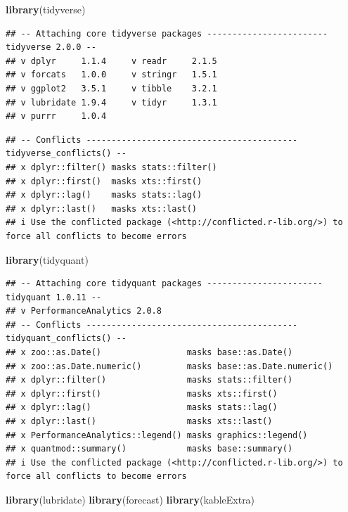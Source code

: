 \documentclass[
]{article}
\newenvironment{Shaded}{\begin{snugshade}}{\end{snugshade}}
\newcommand{\FunctionTok}[1]{\textcolor[rgb]{0.13,0.29,0.53}{\textbf{#1}}}
\newcommand{\NormalTok}[1]{#1}
\begin{document}
\begin{Shaded}
\begin{Highlighting}[]
\FunctionTok{library}\NormalTok{(tidyverse)}
\end{Highlighting}
\end{Shaded}

\begin{verbatim}
## -- Attaching core tidyverse packages ------------------------ tidyverse 2.0.0 --
## v dplyr     1.1.4     v readr     2.1.5
## v forcats   1.0.0     v stringr   1.5.1
## v ggplot2   3.5.1     v tibble    3.2.1
## v lubridate 1.9.4     v tidyr     1.3.1
## v purrr     1.0.4
\end{verbatim}

\begin{verbatim}
## -- Conflicts ------------------------------------------ tidyverse_conflicts() --
## x dplyr::filter() masks stats::filter()
## x dplyr::first()  masks xts::first()
## x dplyr::lag()    masks stats::lag()
## x dplyr::last()   masks xts::last()
## i Use the conflicted package (<http://conflicted.r-lib.org/>) to force all conflicts to become errors
\end{verbatim}

\begin{Shaded}
\begin{Highlighting}[]
\FunctionTok{library}\NormalTok{(tidyquant)}
\end{Highlighting}
\end{Shaded}

\begin{verbatim}
## -- Attaching core tidyquant packages ----------------------- tidyquant 1.0.11 --
## v PerformanceAnalytics 2.0.8     
## -- Conflicts ------------------------------------------ tidyquant_conflicts() --
## x zoo::as.Date()                 masks base::as.Date()
## x zoo::as.Date.numeric()         masks base::as.Date.numeric()
## x dplyr::filter()                masks stats::filter()
## x dplyr::first()                 masks xts::first()
## x dplyr::lag()                   masks stats::lag()
## x dplyr::last()                  masks xts::last()
## x PerformanceAnalytics::legend() masks graphics::legend()
## x quantmod::summary()            masks base::summary()
## i Use the conflicted package (<http://conflicted.r-lib.org/>) to force all conflicts to become errors
\end{verbatim}

\begin{Shaded}
\begin{Highlighting}[]
\FunctionTok{library}\NormalTok{(lubridate)}
\FunctionTok{library}\NormalTok{(forecast)}
\FunctionTok{library}\NormalTok{(kableExtra)}
\end{Highlighting}
\end{Shaded}
\end{document}
